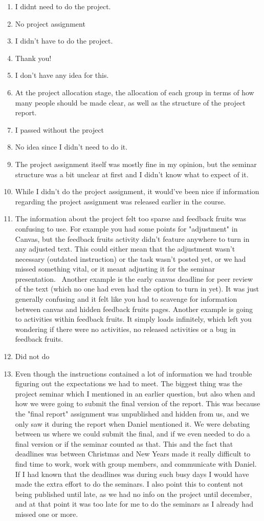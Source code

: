 \documentclass[a4paper]{report}
\begin{document}
\begin{enumerate}
  \item I didnt need to do the project.
  \item No project assignment
  \item I didn’t have to do the project.
  \item Thank you!
  \item I don't have any idea for this.
  \item At the project allocation stage, the allocation of each group in terms of how many people should be made clear, as well as the structure of the project report.
  \item I passed without the project
  \item No idea since I didn't need to do it.
  \item The project assignment itself was mostly fine in my opinion, but the seminar structure was a bit unclear at first and I didn't know what to expect of it.
  \item While I didn't do the project assignment, it would've been nice if information regarding the project assignment was released earlier in the course. 
  \item The information about the project felt too sparse and feedback fruits was confusing to use. For example you had some points for "adjustment" in Canvas, but the feedback fruits activity didn't feature anywhere to turn in any adjusted text. This could either mean that the adjustment wasn't necessary (outdated instruction) or the task wasn't posted yet, or we had missed something vital, or it meant adjusting it for the seminar presentation.   Another example is the early canvas deadline for peer review of the text (which no one had even had the option to turn in yet). It was just generally confusing and it felt like you had to scavenge for information between canvas and hidden feedback fruits pages.  Another example is going to activities within feedback fruits. It simply loads infinitely, which left you wondering if there were no activities, no released activities or a bug in feedback fruits. 
  \item Did not do
  \item Even though the instructions contained a lot of information we had trouble figuring out the expectations we had to meet. The biggest thing was the project seminar which I mentioned in an earlier question, but also when and how we were going to submit the final version of the report. This was because the "final report" assignment was unpublished and hidden from us, and we only saw it during the report when Daniel mentioned it. We were debating between us where we could submit the final, and if we even needed to do a final version or if the seminar counted as that. This and the fact that deadlines was between Christmas and New Years made it really difficult to find time to work, work with group members, and communicate with Daniel. If I had known that the deadlines was during such busy days I would have made the extra effort to do the seminars. I also point this to content not being published until late, as we had no info on the project until december, and at that point it was too late for me to do the seminars as I already had missed one or more.

\end{enumerate}
\end{document}
